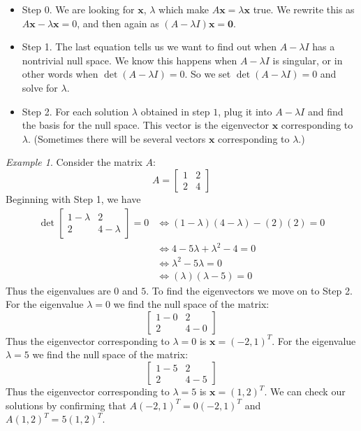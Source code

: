 \documentclass[11pt,oneside]{amsbook}
\theoremstyle{definition}
\theoremstyle{plain}
\theoremstyle{definition}
\theoremstyle{remark}
\newtheorem{example}[theorem]{Example}
\numberwithin{equation}{section}
\numberwithin{figure}{section}
\begin{document}
\begin{itemize}
  \item Step 0. We are looking for $\bm{x}$, $\lambda$ which make $A\bm{x}=\lambda\bm{x}$ true. We rewrite this as $A\bm{x}-\lambda\bm{x}=0$, and then again as $(A-\lambda I)\bm{x}=\bm{0}$.
  \item Step 1. The last equation tells us we want to find out when $A-\lambda I$ has a nontrivial null space. We know this happens when $A-\lambda I$ is singular, or in other words when $\det(A-\lambda I)=0$. So we set $\det(A-\lambda I)=0$ and solve for $\lambda$.
  \item Step 2. For each solution $\lambda$ obtained in step $1$, plug it into $A-\lambda I$ and find the basis for the null space. This vector is the eigenvector $\bm{x}$ corresponding to $\lambda$. (Sometimes there will be several vectors $\bm{x}$ corresponding to $\lambda$.)
\end{itemize}

\begin{example}
  Consider the matrix $A$:
  \[A=\begin{bmatrix}1&2\\2&4\end{bmatrix}
  \]
  Beginning with Step 1, we have
  \begin{align*}
    \det\begin{bmatrix}1-\lambda&2\\2&4-\lambda\end{bmatrix}=0
    &\iff (1-\lambda)(4-\lambda)-(2)(2)=0\\
    &\iff 4-5\lambda+\lambda^2-4=0\\
    &\iff \lambda^2-5\lambda=0\\
    &\iff (\lambda)(\lambda-5)=0
  \end{align*}
  Thus the eigenvalues are $0$ and $5$. To find the eigenvectors we move on to Step 2. For the eigenvalue $\lambda=0$ we find the null space of the matrix:
  \[\begin{bmatrix}1-0&2\\2&4-0\end{bmatrix}
  \]
  Thus the eigenvector corresponding to $\lambda=0$ is $\bm{x}=(-2,1)^T$. For the eigenvalue $\lambda=5$ we find the null space of the matrix:
  \[\begin{bmatrix}1-5&2\\2&4-5\end{bmatrix}
  \]
  Thus the eigenvector corresponding to $\lambda=5$ is $\bm{x}=(1,2)^T$. We can check our solutions by confirming that $A(-2,1)^T=0(-2,1)^T$ and $A(1,2)^T=5(1,2)^T$.
\end{example}
  
\end{document}
